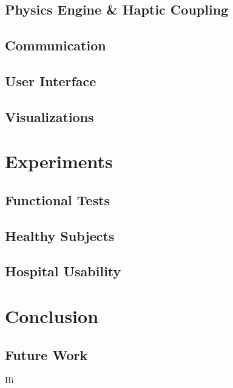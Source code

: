 \documentclass[12pt]{article}
\begin{document}
	\subsection{Physics Engine \& Haptic Coupling}
%


	\subsection{Communication} 
%


	\subsection{User Interface}
%
%
	\subsection{Visualizations}
%
	
\section{Experiments}
	\subsection{Functional Tests}
	\subsection{Healthy Subjects}
		
	\subsection{Hospital Usability} 
	
\section{Conclusion}
	\subsection{Future Work}
	Hi
	


\end{document}
